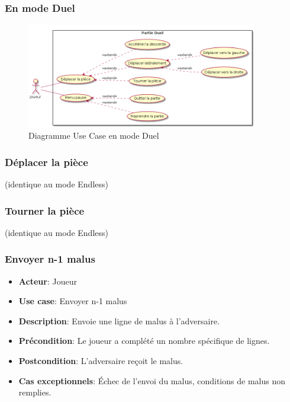 \documentclass{article}
\begin{document}
\subsubsection{En mode Duel}

\begin{figure}[!h]
    \centering
    \includegraphics[width=0.9\textwidth]{./uml/usescase/en-jeu/dual.png}
    \caption{Diagramme Use Case en mode Duel}
    \label{fig:Duel}
\end{figure}

\subsubsection*{Déplacer la pièce} (identique au mode Endless)

\subsubsection*{Tourner la pièce} (identique au mode Endless)

\subsubsection*{Envoyer n-1 malus}
\begin{itemize}
    \item \textbf{Acteur}: Joueur
    \item \textbf{Use case}: Envoyer n-1 malus
    \item \textbf{Description}: Envoie une ligne de malus à l'adversaire.
    \item \textbf{Précondition}: Le joueur a complété un nombre spécifique de lignes.
    \item \textbf{Postcondition}: L'adversaire reçoit le malus.
    \item \textbf{Cas exceptionnels}: Échec de l’envoi du malus, conditions de malus non remplies.
\end{itemize}
\end{document}
